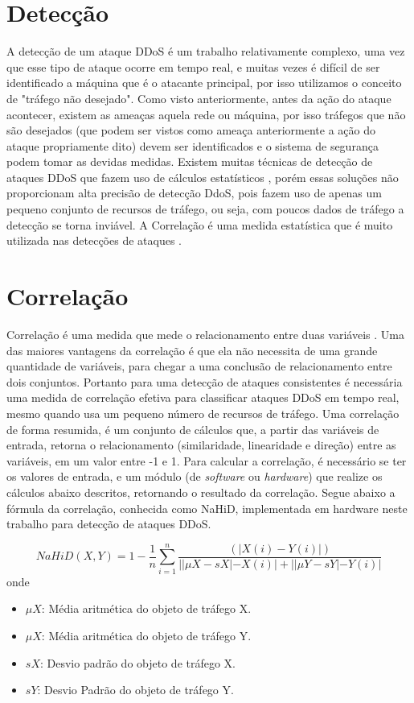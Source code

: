 \section{Detecção}
A detecção de um ataque DDoS é um trabalho relativamente complexo, uma vez que esse tipo de ataque ocorre em tempo real, e muitas vezes é difícil de ser identificado a máquina que é o atacante principal, por isso utilizamos o conceito de "tráfego não desejado". Como visto anteriormente, antes da ação do ataque acontecer, existem as ameaças aquela rede ou máquina, por isso tráfegos que não são desejados (que podem ser vistos como ameaça anteriormente a ação do ataque propriamente dito) devem ser identificados e o sistema de segurança podem tomar as devidas medidas. Existem muitas técnicas de detecção de ataques DDoS que fazem uso de cálculos estatísticos \cite{6814272}, porém essas soluções não proporcionam alta precisão de detecção DdoS, pois fazem uso de apenas um pequeno conjunto de recursos de tráfego, ou seja, com poucos dados de tráfego a detecção se torna inviável. A Correlação é uma medida estatística que é muito utilizada nas detecções de ataques \cite{yu2012discriminating}.

\section{Correlação}

Correlação é uma medida que mede o relacionamento entre duas variáveis .  Uma das maiores vantagens da correlação é que ela não necessita de uma grande quantidade de variáveis, para chegar a uma conclusão de relacionamento entre dois conjuntos. Portanto para uma detecção de ataques consistentes é necessária uma medida de correlação efetiva para classificar ataques DDoS  em tempo real, mesmo quando usa um pequeno número de recursos de tráfego. Uma correlação de forma resumida, é um conjunto de cálculos que, a partir das variáveis de entrada, retorna o relacionamento (similaridade, linearidade e direção) entre as variáveis, em um valor entre -1 e 1. Para calcular a correlação, é necessário se ter os valores de entrada, e um módulo (de \textit{software} ou \textit{hardware}) que realize os  cálculos abaixo descritos, retornando o resultado da correlação. Segue abaixo a fórmula da correlação, conhecida como NaHiD, implementada em hardware neste trabalho para detecção de ataques DDoS.

\begin{equation}
NaHiD(X,Y) = 1 - \frac{1}{n} \sum_{i=1}^{n} \frac{\left(|X(i) -	 Y(i)|\right)}{||\mu{X} - sX| - X(i)| + ||\mu{Y} - sY| - Y(i)|}
\end{equation}
onde
\begin{itemize}
	\item $\mu{X}$: Média aritmética do objeto de tráfego X.
	\item $\mu{X}$: Média aritmética do objeto de tráfego Y.
	\item $sX$: Desvio padrão do objeto de tráfego X.
	\item $sY$: Desvio Padrão do objeto de tráfego Y.
\end{itemize}


